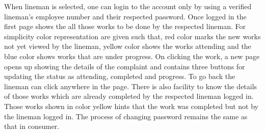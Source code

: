 \documentclass[12pt,a4paper,oneside]{report}
\begin{document}
 \par When lineman is selected, one can login to the account only by using a verified lineman's employee number and their respected password. Once logged in the first page shows the all those works to be done by the respected lineman. For simplicity color representation are given such that, red color marks the new works not yet viewed by the lineman, yellow color shows the works attending and the blue color shows works that are under progress. On clicking the work, a new page opens up showing the details of the complaint and contains three buttons for updating the status as attending, completed and progress. To go back the lineman can click anywhere in the page. There is also facility to know the details of those works which are already completed by the respected lineman logged in. Those works shown in color yellow hints that the work was completed but not by the lineman logged in. The process of changing password remains the same as that in consumer.
\end{document}
